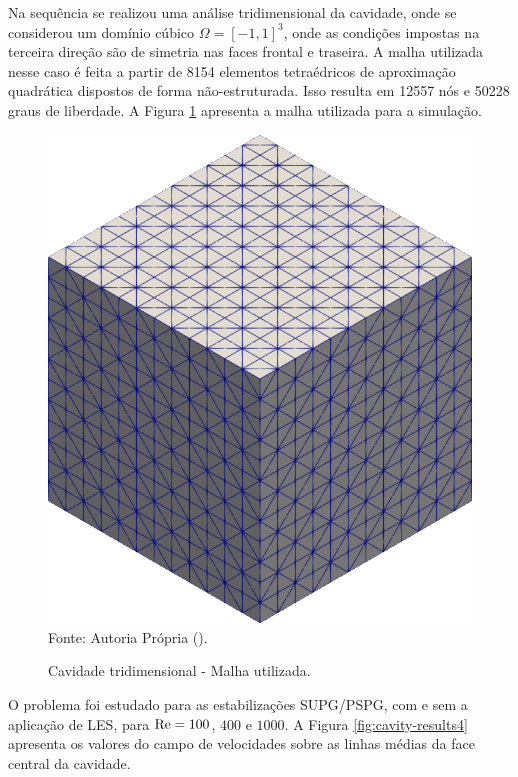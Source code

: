 Na sequência se realizou uma análise tridimensional da cavidade, onde se considerou um domínio cúbico $\Omega=[-1,1]^3$, onde as condições impostas na terceira direção são de simetria nas faces frontal e traseira. A malha utilizada nesse caso é feita a partir de 8154 elementos tetraédricos de aproximação quadrática dispostos de forma não-estruturada. Isso resulta em 12557 nós e 50228 graus de liberdade. A Figura \ref{fig:cavity-mesh3} apresenta a malha utilizada para a simulação.

\begin{figure}[h!]
    \centering
    \caption{Cavidade tridimensional - Malha utilizada.}
    \includegraphics[width=0.4\linewidth]{Figuras/cavity3D/malha.png}
    \\Fonte: Autoria Própria (\the\year).
    \label{fig:cavity-mesh3}
\end{figure}

O problema foi estudado para as estabilizações SUPG/PSPG, com e sem a aplicação de LES, para $\mathrm{Re}=100$, $400$ e $1000$. A Figura \ref{fig:cavity-results4} apresenta os valores do campo de velocidades sobre as linhas médias da face central da cavidade.

